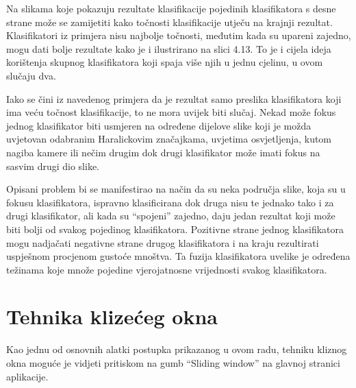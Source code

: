\documentclass[times, utf8, zavrsni, numeric]{fer}
\begin{document}
\newpage

Na slikama koje pokazuju rezultate klasifikacije pojedinih klasifikatora s 
desne strane može se zamijetiti kako točnosti klasifikacije utječu na
krajnji rezultat. Klasifikatori iz primjera nisu najbolje točnosti, 
međutim kada su upareni zajedno, mogu dati bolje rezultate kako je 
i ilustrirano na slici 4.13. To je i cijela ideja korištenja skupnog
klasifikatora koji spaja više njih u jednu cjelinu, u ovom slučaju
dva. 

\bigbreak

Iako se čini iz navedenog primjera da je rezultat samo preslika 
klasifikatora koji ima veću točnost klasifikacije, to ne mora uvijek 
biti slučaj. Nekad može fokus jednog klasifikator biti usmjeren 
na određene dijelove slike koji je možda uvjetovan odabranim 
Haralickovim značajkama, uvjetima osvjetljenja, kutom nagiba kamere ili 
nečim drugim dok drugi klasifikator može imati fokus na sasvim drugi 
dio slike. 

\bigbreak

Opisani problem bi se manifestirao na način da su neka 
područja slike, koja su u fokusu klasifikatora, ispravno klasificirana 
dok druga nisu te jednako tako i za drugi klasifikator, ali kada
su \enquote{spojeni} zajedno, daju jedan rezultat koji može biti bolji od 
svakog pojedinog klasifikatora. Pozitivne strane jednog klasifikatora mogu nadjačati 
negativne strane drugog klasifikatora i na kraju rezultirati uspješnom
procjenom gustoće mnoštva. Ta fuzija klasifikatora uvelike je određena 
težinama koje množe pojedine vjerojatnosne vrijednosti svakog klasifikatora.


\chapter{Tehnika klizećeg okna}

Kao jednu od osnovnih alatki postupka prikazanog u ovom radu, tehniku
kliznog okna moguće je vidjeti pritiskom na gumb \enquote{Sliding window}
na glavnoj stranici aplikacije. 

\bigbreak
\end{document}
